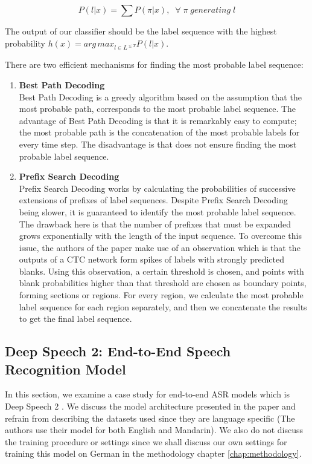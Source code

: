 \begin{equation}
\label{eq:22}
P(l|x) = \sum P(\pi|x), \; \;  \forall \; \pi \; generating \; l
\end{equation}


The output of our classifier should be the label sequence with the highest probability $h(x) = {arg \, max}_{l \in {L^{\leq T}}} P(l|x)$.

There are two efficient mechanisms for finding the most probable label sequence:
\begin{enumerate}
	\item \textbf{Best Path Decoding} \mbox{}\\
	 Best Path Decoding is a greedy algorithm based on the assumption that the most probable path, corresponds to the most probable label sequence. The advantage of Best Path Decoding is that it is remarkably easy to compute; the most probable path is the concatenation of the most probable labels for every time step. The disadvantage is that does not ensure finding the most probable label sequence.
	\item \textbf{Prefix Search Decoding} \mbox{}\\
	Prefix Search Decoding works by calculating the probabilities of successive extensions of prefixes of label sequences. Despite Prefix Search Decoding being slower, it is guaranteed to identify the most probable label sequence. The drawback here is that the number of prefixes that must be expanded grows exponentially with the length of the input sequence. To overcome this issue, the authors of the paper make use of an observation which is that the outputs of a \ac{CTC} network form spikes of labels with strongly predicted blanks. Using this observation, a certain threshold is chosen, and points with blank probabilities higher than that threshold are chosen as boundary points, forming sections or regions. For every region, we calculate the most probable label sequence for each region separately, and then we concatenate the results to get the final label sequence. 
\end{enumerate} 


\subsection{Deep Speech 2: End-to-End Speech Recognition Model} 
\label{bg:s3_sub3}

In this section, we examine a case study for end-to-end \ac{ASR} models which is Deep Speech 2 \cite{amodei2016deep}. We discuss the model architecture presented in the paper and refrain from describing the datasets used since they are language specific (The authors use their model for both English and Mandarin). We also do not discuss the training procedure or settings since we shall discuss our own settings for training this model on German in the methodology chapter \ref{chap:methodology}.

